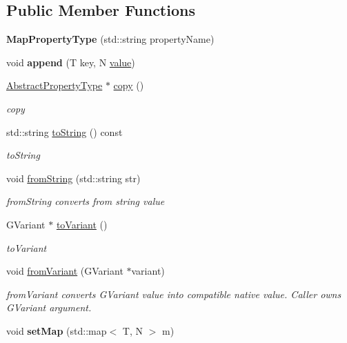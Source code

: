 \subsection*{Public Member Functions}
\begin{DoxyCompactItemize}
\item 
\hypertarget{classMapPropertyType_aa1a20f8411d6642e6d9d16d2c49e8616}{{\bfseries Map\-Property\-Type} (std\-::string property\-Name)}\label{classMapPropertyType_aa1a20f8411d6642e6d9d16d2c49e8616}

\item 
\hypertarget{classMapPropertyType_a204d5a2ef375b9f96badbac88e90c399}{void {\bfseries append} (T key, N \hyperlink{classAbstractPropertyType_ae723621925382263eba046fa1ca8e36d}{value})}\label{classMapPropertyType_a204d5a2ef375b9f96badbac88e90c399}

\item 
\hyperlink{classAbstractPropertyType}{Abstract\-Property\-Type} $\ast$ \hyperlink{classMapPropertyType_abcc0f1c2cd4faff2859420f90dd67cad}{copy} ()
\begin{DoxyCompactList}\small\item\em copy \end{DoxyCompactList}\item 
std\-::string \hyperlink{classMapPropertyType_a662d25c3cd9e1732f0cd2dabd38c1bcd}{to\-String} () const 
\begin{DoxyCompactList}\small\item\em to\-String \end{DoxyCompactList}\item 
\hypertarget{classMapPropertyType_aae407d89167cad46b2ab63971d1e68f5}{void \hyperlink{classMapPropertyType_aae407d89167cad46b2ab63971d1e68f5}{from\-String} (std\-::string str)}\label{classMapPropertyType_aae407d89167cad46b2ab63971d1e68f5}

\begin{DoxyCompactList}\small\item\em from\-String converts from string value \end{DoxyCompactList}\item 
G\-Variant $\ast$ \hyperlink{classMapPropertyType_a0dfca18093e88f7ae8788bf1ce852109}{to\-Variant} ()
\begin{DoxyCompactList}\small\item\em to\-Variant \end{DoxyCompactList}\item 
void \hyperlink{classMapPropertyType_a9038e06690c5d3718be1aadb6752bfbe}{from\-Variant} (G\-Variant $\ast$variant)
\begin{DoxyCompactList}\small\item\em from\-Variant converts G\-Variant value into compatible native value. Caller owns G\-Variant argument. \end{DoxyCompactList}\item 
\hypertarget{classMapPropertyType_abfecbe98555c77f13bab01892ea143a7}{void {\bfseries set\-Map} (std\-::map$<$ T, N $>$ m)}\label{classMapPropertyType_abfecbe98555c77f13bab01892ea143a7}

\end{DoxyCompactItemize}
